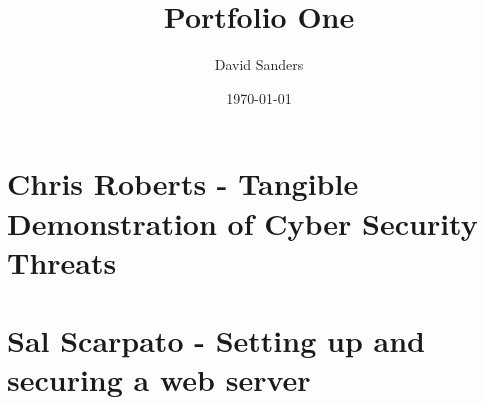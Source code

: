 \documentclass[12pt]{article}
\title{Portfolio One}
\author{David Sanders}
\date{\today}
\begin{document}

\tableofcontents

\pagebreak\part{Chris Roberts - Tangible Demonstration of Cyber Security Threats}


\pagebreak\part{Sal Scarpato - Setting up and securing a web server}

\end{document}
